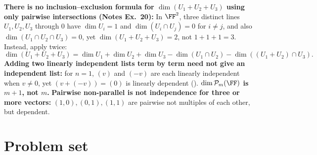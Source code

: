 \documentclass[10pt]{scrartcl}
\newcommand{\PP}{\mathcal P}
\begin{document}
\begin{trapbox}
  \ii \textbf{There is no inclusion--exclusion formula for $\dim(U_1+U_2+U_3)$ using only pairwise intersections (Notes Ex.~20):} In $\FF^2$, three distinct lines $U_1,U_2,U_3$ through $0$ have $\dim U_i=1$ and $\dim(U_i\cap U_j)=0$ for $i\ne j$, and also $\dim(U_1\cap U_2\cap U_3)=0$, yet $\dim(U_1+U_2+U_3)=2$, not $1+1+1=3$. Instead, apply  twice:
  \[
    \dim(U_1+U_2+U_3)=\dim U_1+\dim U_2+\dim U_3-\dim(U_1\cap U_2)-\dim((U_1+U_2)\cap U_3).
  \]
  \ii \textbf{Adding two linearly independent lists term by term need not give an independent list:} for $n=1$, $(v)$ and $(-v)$ are each linearly independent when $v\ne 0$, yet $(v+(-v))=(0)$ is linearly dependent ().
  \ii \textbf{$\dim\PP_m(\FF)$ is $m+1$, not $m$.}
  \ii \textbf{Pairwise non-parallel is not independence for three or more vectors:} $(1,0),(0,1),(1,1)$ are pairwise not multiples of each other, but dependent.
\end{trapbox}

\section{Problem set}
\renewcommand{\bigskip}{\medskip}
\end{document}
